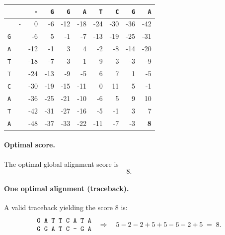\medskip
\setlength{\tabcolsep}{6pt}
\renewcommand{\arraystretch}{1.15}
\begin{tabular}{@{}c c | *{8}{r}@{}}
    \toprule
               &            & \texttt{-} & \texttt{G} & \texttt{G} & \texttt{A} & \texttt{T} & \texttt{C} & \texttt{G} & \texttt{A} \\
    \midrule
               & \texttt{-} & 0          & -6         & -12        & -18        & -24        & -30        & -36        & -42        \\
    \texttt{G} &            & -6         & 5          & -1         & -7         & -13        & -19        & -25        & -31        \\
    \texttt{A} &            & -12        & -1         & 3          & 4          & -2         & -8         & -14        & -20        \\
    \texttt{T} &            & -18        & -7         & -3         & 1          & 9          & 3          & -3         & -9         \\
    \texttt{T} &            & -24        & -13        & -9         & -5         & 6          & 7          & 1          & -5         \\
    \texttt{C} &            & -30        & -19        & -15        & -11        & 0          & 11         & 5          & -1         \\
    \texttt{A} &            & -36        & -25        & -21        & -10        & -6         & 5          & 9          & 10         \\
    \texttt{T} &            & -42        & -31        & -27        & -16        & -5         & -1         & 3          & 7          \\
    \texttt{A} &            & -48        & -37        & -33        & -22        & -11        & -7         & -3         & \textbf{8} \\
    \bottomrule
\end{tabular}
\normalsize

\paragraph{Optimal score.}
The optimal global alignment score is
\[
    \boxed{8}.
\]

\paragraph{One optimal alignment (traceback).}
A valid traceback yielding the score $8$ is:
\[
    \begin{array}{@{}c@{}}
        \texttt{G A T T C A T A} \\
        \texttt{G G A T C - G A}
    \end{array}
    \quad\Rightarrow\quad
    5 - 2 - 2 + 5 + 5 - 6 - 2 + 5 \;=\; 8.
\]

